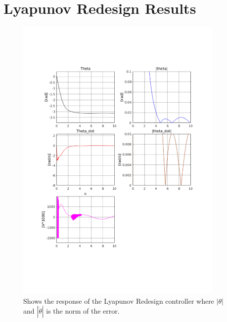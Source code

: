\chapter{Lyapunov Redesign Results} %
\label{cha:lyapunov_redesign_results}
\begin{figure}[H]
        \centering
        \includegraphics[width=0.9\textwidth,trim=0.5cm 5cm 0.5cm 4cm, clip]{lyap.pdf}
        \caption{Shows the response of the Lyapunov Redesign controller where $|\theta|$ and $|\dot{\theta}|$ is the norm of the error.}
        \label{fig:lyap}
\end{figure}

